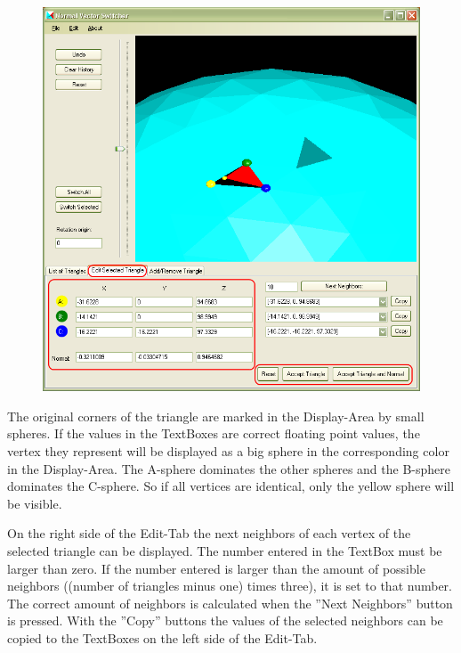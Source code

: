 \begin{figure}[htb]
	\centering
	\includegraphics[width=0.8\linewidth]{window6}
\end{figure}

\noindent
The original corners of the triangle are marked in the Display-Area by small spheres. If the values in the TextBoxes are correct floating point values, the vertex they represent will be displayed as a big sphere in the corresponding color in the Display-Area. The A-sphere dominates the other spheres and the B-sphere dominates the C-sphere. So if all vertices are identical, only the yellow sphere will be visible.

On the right side of the Edit-Tab the next neighbors of each vertex of the selected triangle can be displayed. The number entered in the TextBox must be larger than zero. If the number entered is larger than the amount of possible neighbors ((number of triangles minus one) times three), it is set to that number. The correct amount of neighbors is calculated when the ''Next Neighbors'' button is pressed. With the ''Copy'' buttons the values of the selected neighbors can be copied to the TextBoxes on the left side of the Edit-Tab.

